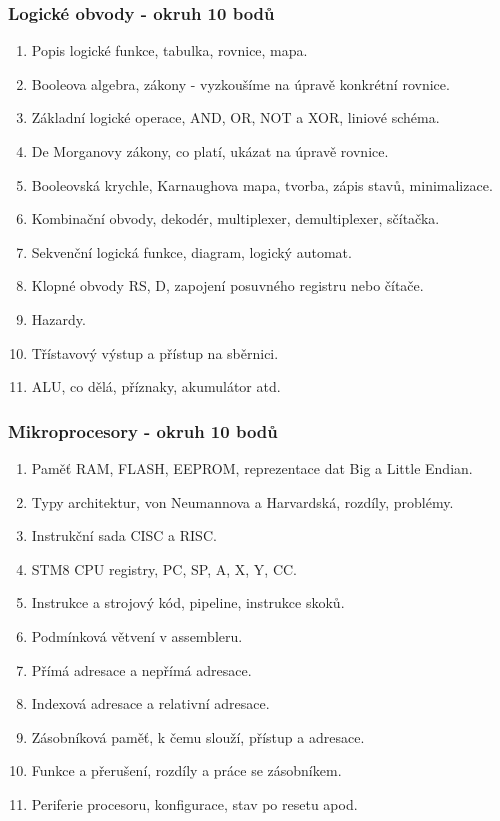 	\begin{frame}
    \frametitle{Logické obvody - okruh 10 bodů}
		\small
		\begin{enumerate}
			\item Popis logické funkce, tabulka, rovnice, mapa.
			\item Booleova algebra, zákony - vyzkoušíme na úpravě konkrétní rovnice.
			\item Základní logické operace, AND, OR, NOT a XOR, liniové schéma.
			\item De Morganovy zákony, co platí, ukázat na úpravě rovnice.
			\item Booleovská krychle, Karnaughova mapa, tvorba, zápis stavů, minimalizace.
			\item Kombinační obvody, dekodér, multiplexer, demultiplexer, sčítačka.
			\item Sekvenční logická funkce, diagram, logický automat.
			\item Klopné obvody RS, D, zapojení posuvného registru nebo čítače.
			\item Hazardy.
			\item Třístavový výstup a přístup na sběrnici.
			\item ALU, co dělá, příznaky, akumulátor atd.
		\end{enumerate}
		
	\end{frame}
	
	\begin{frame}
    \frametitle{Mikroprocesory - okruh 10 bodů}
		\small
		\begin{enumerate}
			\item Paměť RAM, FLASH, EEPROM, reprezentace dat Big a Little Endian.
			\item Typy architektur, von Neumannova a Harvardská, rozdíly, problémy.
			\item Instrukční sada CISC a RISC.
			\item STM8 CPU registry, PC, SP, A, X, Y, CC.
			\item Instrukce a strojový kód, pipeline, instrukce skoků.
			\item Podmínková větvení v assembleru.
			\item Přímá adresace a nepřímá adresace.
			\item Indexová adresace a relativní adresace.
			\item Zásobníková paměť, k čemu slouží, přístup a adresace.
			\item Funkce a přerušení, rozdíly a práce se zásobníkem.
			\item Periferie procesoru, konfigurace, stav po resetu apod.
		\end{enumerate}
		
	\end{frame}

